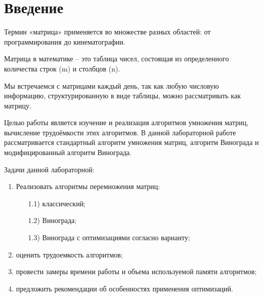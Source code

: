 \chapter*{Введение}

Термин «матрица» применяется во множестве разных областей: от
программирования до кинематографии.

Матрица в математике -- это таблица чисел, состоящая из определенного количества строк (m) и столбцов (n).

Мы встречаемся с матрицами каждый день, так как любую числовую информацию, структурированную в виде таблицы, можно рассматривать как матрицу.


Целью работы является изучение и реализация алгоритмов
умножения матриц, вычисление трудоёмкости этих алгоритмов. В данной
лабораторной работе рассматривается стандартный алгоритм умножения
матриц, алгоритм Винограда и модифицированный алгоритм Винограда.


Задачи данной лабораторной:

\begin{enumerate}[label=\arabic*)]
	\item Реализовать алгоритмы перемножения матриц:
	\begin{enumerate}
		\item[1.1)] классический;
		\item[1.2)] Винограда;
		\item[1.3)] Винограда с оптимизациями согласно варианту;
	\end{enumerate}
	\item оценить трудоемкость алгоритмов;
	\item провести замеры времени работы и объема используемой памяти алгоритмов;
	\item предложить рекомендации об особенностях применения оптимизаций.
\end{enumerate}
